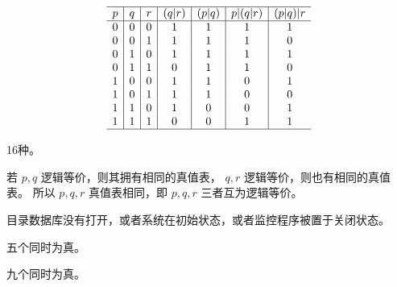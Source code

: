 {{        %
        \begin{practices}
            \begin{table}[H]
                \[
                    \begin{array}{c|c|c|c|c|c|c}
                        \hline
                        p & q & r & (q | r) & (p | q) & p | (q | r) & (p | q) | r \\
                        \hline
                        0 & 0 & 0 & 1 & 1 & 1 & 1 \\
                        0 & 0 & 1 & 1 & 1 & 1 & 0 \\
                        0 & 1 & 0 & 1 & 1 & 1 & 1 \\
                        0 & 1 & 1 & 0 & 1 & 1 & 0 \\
                        1 & 0 & 0 & 1 & 1 & 0 & 1 \\
                        1 & 0 & 1 & 1 & 1 & 0 & 0 \\
                        1 & 1 & 0 & 1 & 0 & 0 & 1 \\
                        1 & 1 & 1 & 0 & 0 & 1 & 1 \\
                        \hline
                   \end{array}
               \]
            \end{table}
        \end{practices}

        \begin{practices}
            16种。
        \end{practices}

        \begin{practices}
            若 $p, q$ 逻辑等价，则其拥有相同的真值表， $q, r$ 逻辑等价，则也有相同的真值表。
            所以 $p, q, r$ 真值表相同，即 $p, q, r$ 三者互为逻辑等价。
        \end{practices}

        \begin{practices}
            目录数据库没有打开，或者系统在初始状态，或者监控程序被置于关闭状态。
        \end{practices}

        \begin{practices}
            五个同时为真。
        \end{practices}

        \begin{practices}
            九个同时为真。
        \end{practices}

}}
